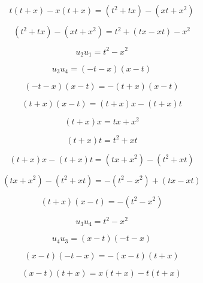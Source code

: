 \documentclass[12pt]{article}
\begin{document}
\begin{equation}
t(t+x)-x(t+x)=(t^2+tx)-(xt+x^2)
\end{equation}

\begin{equation}
(t^2+tx)-(xt+x^2)=t^2+(tx-xt)-x^2
\end{equation}

\begin{equation}
u_2u_1=t^2-x^2
\end{equation}

\begin{equation}
u_3u_4=(-t-x)(x-t)
\end{equation}

\begin{equation}
(-t-x)(x-t)=-(t+x)(x-t)
\end{equation}

\begin{equation}
(t+x)(x-t)=(t+x)x-(t+x)t
\end{equation}

\begin{equation}
(t+x)x=tx+x^2
\end{equation}

\begin{equation}
(t+x)t=t^2+xt
\end{equation}

\begin{equation}
(t+x)x-(t+x)t=(tx+x^2)-(t^2+xt)
\end{equation}

\begin{equation}
(tx+x^2)-(t^2+xt)=-(t^2-x^2)+(tx-xt)
\end{equation}

\begin{equation}
(t+x)(x-t)=-(t^2-x^2)
\end{equation}

\begin{equation}
u_3u_4=t^2-x^2
\end{equation}

\begin{equation}
u_4u_3=(x-t)(-t-x)
\end{equation}

\begin{equation}
(x-t)(-t-x)=-(x-t)(t+x)
\end{equation}

\begin{equation}
(x-t)(t+x)=x(t+x)-t(t+x)
\end{equation}
\end{document}
